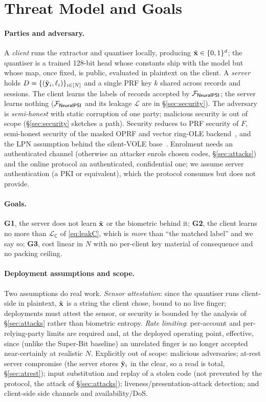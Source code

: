 \section{Threat Model and Goals}
\label{sec:threat}

\paragraph{Parties and adversary.} A \emph{client} runs the extractor and quantiser locally, producing
$\tilde{\mathbf{x}} \in \{0,1\}^{d}$; the quantiser is a trained 128-bit head whose constants ship with the model but
whose map, once fixed, is public, evaluated in plaintext on the client. A \emph{server} holds
$D = \{(\tilde{\mathbf{y}}_i, \ell_i)\}_{i \in [N]}$ and a single PRF key $k$ shared across records and sessions. The
client learns the labels of records accepted by $\mathcal{F}_{\mathsf{NeuralPSI}}$; the server learns nothing ($\mathcal{F}_{\mathsf{NeuralPSI}}$ and its
leakage $\mathcal{L}$ are in \S\ref{sec:security}). The adversary is \emph{semi-honest} with static
corruption of one party; malicious security is out of scope (\S\ref{sec:security} sketches a path).
Security reduces to PRF security of $F$, semi-honest security of the masked OPRF and vector ring-OLE
backend~\cite{UzunEtAl21,BuiCong25}, and the LPN assumption behind the silent-VOLE
base~\cite{BoyleEtAl19,RindalSchoppmann21}. Enrolment needs an authenticated channel (otherwise an
attacker enrols chosen codes, \S\ref{sec:attacks}) and the online protocol an authenticated,
confidential one; we assume server authentication (a PKI or equivalent), which the protocol consumes
but does not provide.

\paragraph{Goals.} \textbf{G1}, the server does not learn $\tilde{\mathbf{x}}$ or the biometric behind it;
\textbf{G2}, the client learns no more than $\mathcal{L}_{\mathsf{C}}$ of \eqref{eq:leakC}, which is
\emph{more} than ``the matched label'' and we say so; \textbf{G3}, cost linear in $N$ with no per-client
key material of consequence and no packing ceiling.

\paragraph{Deployment assumptions and scope.} Two assumptions do real work. \emph{Sensor attestation}:
since the quantiser runs client-side in plaintext, $\tilde{\mathbf{x}}$ is a string the client chose, bound to no live
finger; deployments must attest the sensor, or security is bounded by the analysis of
\S\ref{sec:attacks} rather than biometric entropy. \emph{Rate limiting}: per-account and
per-relying-party limits are required and, at the deployed operating point, effective, since (unlike
the Super-Bit baseline) an unrelated finger is no longer accepted near-certainly at realistic $N$.
Explicitly out of scope: malicious adversaries; at-rest server compromise (the server stores $\tilde{\mathbf{y}}_i$ in
the clear, so a read is total, \S\ref{sec:atrest}); input substitution and replay of a stolen code (not
prevented by the protocol, the attack of \S\ref{sec:attacks}); liveness/presentation-attack detection;
and client-side side channels and availability/DoS.
